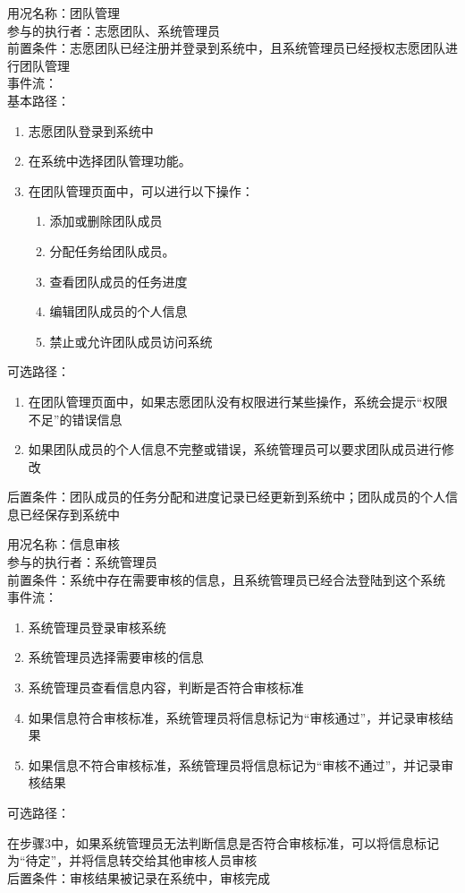 \begin{framed}
\noindent
用况名称：团队管理\\
参与的执行者：志愿团队、系统管理员\\
前置条件：志愿团队已经注册并登录到系统中，且系统管理员已经授权志愿团队进行团队管理\\
事件流：\\
基本路径：
\begin{enumerate}[itemsep=2pt,topsep=0pt,parsep=0pt,itemindent=1em] \item 志愿团队登录到系统中 \item 在系统中选择团队管理功能。 \item 在团队管理页面中，可以进行以下操作： \begin{enumerate}[itemsep=2pt,topsep=0pt,parsep=0pt,itemindent=1em] \item 添加或删除团队成员 \item 分配任务给团队成员。 \item 查看团队成员的任务进度 \item 编辑团队成员的个人信息 \item 禁止或允许团队成员访问系统\end{enumerate} 
\end{enumerate}
\noindent
可选路径： \par
 \begin{enumerate}[itemsep=2pt,topsep=0pt,parsep=0pt,itemindent=1em]  \item 在团队管理页面中，如果志愿团队没有权限进行某些操作，系统会提示“权限不足”的错误信息 \item 如果团队成员的个人信息不完整或错误，系统管理员可以要求团队成员进行修改  \end{enumerate} 
后置条件：团队成员的任务分配和进度记录已经更新到系统中；团队成员的个人信息已经保存到系统中

\end{framed}

\begin{framed}
\noindent
用况名称：信息审核\\
参与的执行者：系统管理员\\
前置条件：系统中存在需要审核的信息，且系统管理员已经合法登陆到这个系统
事件流： \begin{enumerate}[itemsep=2pt,topsep=0pt,parsep=0pt,itemindent=1em] \item 系统管理员登录审核系统 \item 系统管理员选择需要审核的信息 \item 系统管理员查看信息内容，判断是否符合审核标准 \item 如果信息符合审核标准，系统管理员将信息标记为“审核通过”，并记录审核结果 \item 如果信息不符合审核标准，系统管理员将信息标记为“审核不通过”，并记录审核结果 \end{enumerate}
\noindent
可选路径： \par
在步骤3中，如果系统管理员无法判断信息是否符合审核标准，可以将信息标记为“待定”，并将信息转交给其他审核人员审核\\
后置条件：审核结果被记录在系统中，审核完成

\end{framed}